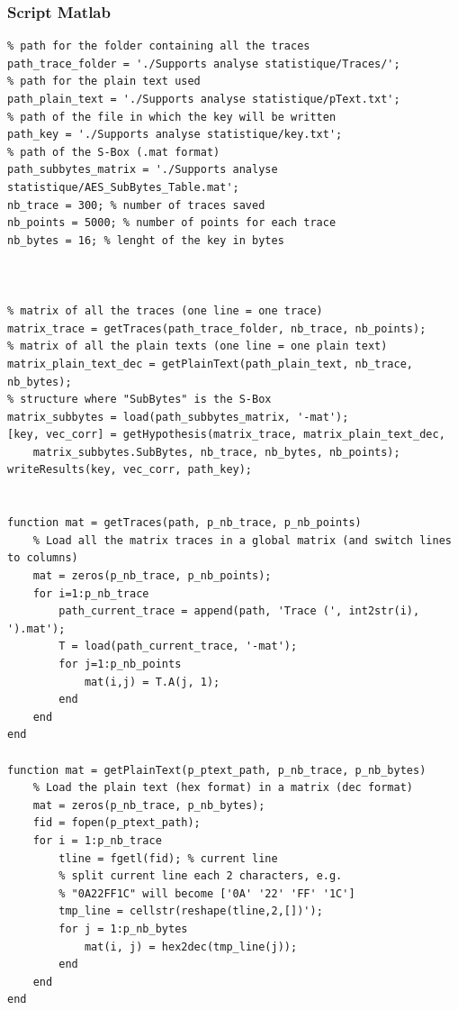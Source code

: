 \documentclass[a4paper, 12pt]{article}
\begin{document}
		\subsubsection{Script Matlab}
		\label{Script_Matlab}
\begin{lstlisting}
% path for the folder containing all the traces
path_trace_folder = './Supports analyse statistique/Traces/'; 
% path for the plain text used
path_plain_text = './Supports analyse statistique/pText.txt';
% path of the file in which the key will be written 
path_key = './Supports analyse statistique/key.txt'; 
% path of the S-Box (.mat format)
path_subbytes_matrix = './Supports analyse statistique/AES_SubBytes_Table.mat'; 
nb_trace = 300; % number of traces saved
nb_points = 5000; % number of points for each trace
nb_bytes = 16; % lenght of the key in bytes



% matrix of all the traces (one line = one trace)
matrix_trace = getTraces(path_trace_folder, nb_trace, nb_points); 
% matrix of all the plain texts (one line = one plain text)
matrix_plain_text_dec = getPlainText(path_plain_text, nb_trace, nb_bytes); 
% structure where "SubBytes" is the S-Box
matrix_subbytes = load(path_subbytes_matrix, '-mat');
[key, vec_corr] = getHypothesis(matrix_trace, matrix_plain_text_dec,
	matrix_subbytes.SubBytes, nb_trace, nb_bytes, nb_points);
writeResults(key, vec_corr, path_key);


function mat = getTraces(path, p_nb_trace, p_nb_points)
    % Load all the matrix traces in a global matrix (and switch lines to columns)
    mat = zeros(p_nb_trace, p_nb_points);
    for i=1:p_nb_trace
        path_current_trace = append(path, 'Trace (', int2str(i), ').mat');
        T = load(path_current_trace, '-mat');
        for j=1:p_nb_points
            mat(i,j) = T.A(j, 1);
        end
    end
end

function mat = getPlainText(p_ptext_path, p_nb_trace, p_nb_bytes)
    % Load the plain text (hex format) in a matrix (dec format)
    mat = zeros(p_nb_trace, p_nb_bytes);
    fid = fopen(p_ptext_path);
    for i = 1:p_nb_trace
        tline = fgetl(fid); % current line
        % split current line each 2 characters, e.g. 
        % "0A22FF1C" will become ['0A' '22' 'FF' '1C']
        tmp_line = cellstr(reshape(tline,2,[])'); 
        for j = 1:p_nb_bytes
            mat(i, j) = hex2dec(tmp_line(j));
        end
    end
end


\end{lstlisting}
\end{document}
